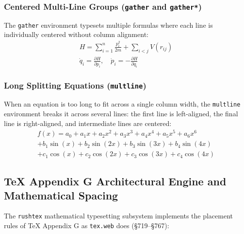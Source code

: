 \documentclass[11pt, a4paper]{article}
\begin{document}
\subsubsection{Centered Multi-Line Groups (\texttt{gather} and \texttt{gather*})}
The \texttt{gather} environment typesets multiple formulas where each line is individually centered without column alignment:
\begin{gather}
H = \sum_{i=1}^n \frac{p_i^2}{2m} + \sum_{i<j} V(r_{ij}) \\
\dot{q}_i = \frac{\partial H}{\partial p_i}, \quad \dot{p}_i = -\frac{\partial H}{\partial q_i}
\end{gather}

\subsubsection{Long Splitting Equations (\texttt{multline})}
When an equation is too long to fit across a single column width, the \texttt{multline} environment breaks it across several lines: the first line is left-aligned, the final line is right-aligned, and intermediate lines are centered:
\begin{multline}
f(x) = a_0 + a_1 x + a_2 x^2 + a_3 x^3 + a_4 x^4 + a_5 x^5 + a_6 x^6 \\
+ b_1 \sin(x) + b_2 \sin(2x) + b_3 \sin(3x) + b_4 \sin(4x) \\
+ c_1 \cos(x) + c_2 \cos(2x) + c_3 \cos(3x) + c_4 \cos(4x)
\end{multline}

\subsection{TeX Appendix G Architectural Engine and Mathematical Spacing}
The \texttt{rushtex} mathematical typesetting subsystem implements the placement rules of TeX Appendix G as \texttt{tex.web} does (\S719--\S767):
\end{document}
